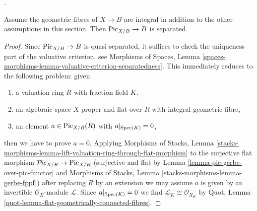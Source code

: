 \begin{lemma}
\label{lemma-pic-functor-uniqueness-part}
\begin{reference}
\cite[Expos\'e 232, Theorem 3.1, pp. 148--149]{FGA}.
\end{reference}
Assume the geometric fibres of $X \to B$ are integral
in addition to the other assumptions in this section.
Then $\mathrm{Pic}_{X/B} \to B$ is separated.
\end{lemma}

\begin{proof}
Since $\mathrm{Pic}_{X/B} \to B$ is quasi-separated, it suffices
to check the uniqueness part of the valuative criterion, see
Morphisms of Spaces, Lemma
\ref{spaces-morphisms-lemma-valuative-criterion-separatedness}.
This immediately reduces to the following problem: given
\begin{enumerate}
\item a valuation ring $R$ with fraction field $K$,
\item an algebraic space $X$ proper and flat over $R$
with integral geometric fibre,
\item an element $a \in \mathrm{Pic}_{X/R}(R)$ with
$a|_{\mathop{\mathrm{Spec}}(K)} = 0$,
\end{enumerate}
then we have to prove $a = 0$. Applying
Morphisms of Stacks, Lemma
\ref{stacks-morphisms-lemma-lift-valuation-ring-through-flat-morphism}
to the surjective flat morphism
$\mathcal{P}\!\mathit{ic}_{X/R} \to \mathrm{Pic}_{X/R}$
(surjective and flat by Lemma \ref{lemma-pic-gerbe-over-pic-functor} and
Morphisms of Stacks, Lemma \ref{stacks-morphisms-lemma-gerbe-fppf})
after replacing $R$ by an extension we may assume
$a$ is given by an invertible $\mathcal{O}_X$-module
$\mathcal{L}$. Since $a|_{\mathop{\mathrm{Spec}}(K)} = 0$ we find
$\mathcal{L}_K \cong \mathcal{O}_{X_K}$ by
Quot, Lemma \ref{quot-lemma-flat-geometrically-connected-fibres}.


\end{proof}
